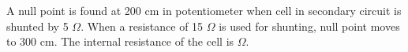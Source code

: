 \item A null point is found at 200 cm in potentiometer when cell in secondary circuit is shunted by 5 $\Omega$. When a resistance of 15 $\Omega$ is used for shunting, null point moves to 300 cm. The internal resistance of the cell is \underline{\hspace{2.5cm}} $\Omega$.